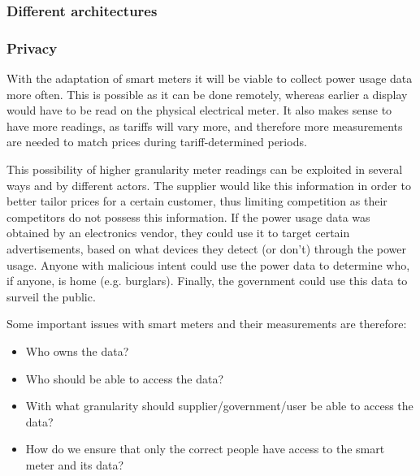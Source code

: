 \subsubsection{Different architectures}

\subsubsection{Privacy}
With the adaptation of smart meters it will be viable to collect power usage data more often.
This is possible as it can be done remotely, whereas earlier a display would have to be read on the physical electrical meter.
It also makes sense to have more readings, as tariffs will vary more, and therefore more measurements are needed to match prices during tariff-determined periods.

This possibility of higher granularity meter readings can be exploited in several ways and by different actors.
The supplier would like this information in order to better tailor prices for a certain customer, thus limiting competition as their competitors do not possess this information.
If the power usage data was obtained by an electronics vendor, they could use it to target certain advertisements, based on what devices they detect (or don't) through the power usage.
Anyone with malicious intent could use the power data to determine who, if anyone, is home (e.g. burglars).
Finally, the government could use this data to surveil the public.

Some important issues with smart meters and their measurements are therefore:
\begin{itemize}
	\item Who owns the data?
	\item Who should be able to access the data?
	\item With what granularity should supplier/government/user be able to access the data?
	\item How do we ensure that only the correct people have access to the smart meter and its data?
\end{itemize}

